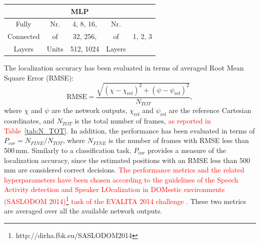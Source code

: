 \documentclass[review]{elsarticle}
\newcommand{\tableref}[1]{Table~\ref{#1}}
\begin{document}
\begin{table}[t]
{\begin{tabular} { c|c|c|c|c|c|c|c}
		\hline
		\multicolumn{8}{c}{MLP}\\
		\hline
		Fully  & Nr.  & \multicolumn{3}{|c|}{4, 8, 16,} & Nr. &  \multicolumn{2}{|c}{ }\\
		Connected	& of & \multicolumn{3}{|c|}{32, 256,} & of & \multicolumn{2}{|c}{ 1, 2, 3}\\
		Layers	& Units & \multicolumn{3}{|c|}{512, 1024} & Layers & \multicolumn{2}{|c}{} \\
		\hline                                                                      
	\end{tabular}
	}
\end{table}


The localization accuracy has been evaluated in terms of averaged Root Mean Square Error (RMSE):
\begin{equation}
\text{RMSE} = \frac{\sqrt{(\chi-\chi_{\text{ref}})^2 + (\psi-\psi_{\text{ref}})^2}}{N_{TOT}},
\end{equation}
where $\chi$ and $\psi$  are the network outputs, $\chi_{\text{ref}}$ and $\psi_{\text{ref}}$ are the reference Cartesian coordinates, and $N_{TOT}$ is the total number of frames, \textcolor{red}{{as reported in \tableref{tab:N_TOT}. }}
In addition, the performance has been evaluated in terms of $P_{cor} = N_{FINE}/N_{TOT}$, where $N_{FINE}$ is the 
number of frames with RMSE less than 500\,mm. 
Similarly to a classification task, $P_{cor}$ provides a measure of the localization accuracy, since the estimated positions with an RMSE less than 500\,mm are considered correct decisions. \textcolor{red}{The performance metrics and the related hyperparameters have been chosen according to the guidelines of the Speech Activity detection and Speaker LOcalization in DOMestic environments (SASLODOM 2014)\footnote{http://dirha.fbk.eu/SASLODOM2014} task of the EVALITA 2014 challenge \cite{basili2014proceedings}.} These two metrics are averaged over all the available network outputs. 
\end{document}
